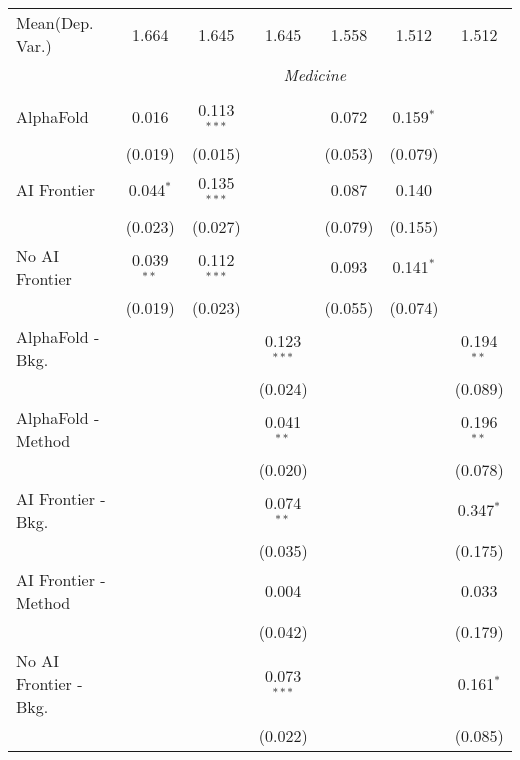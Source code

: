 \begin{tabular}{lcccccc}
Mean(Dep. Var.) & 1.664 & 1.645 & 1.645 & 1.558 & 1.512 & 1.512 \\
 & \multicolumn{6}{c}{\textit{Medicine}} \\ \\
   AlphaFold               & 0.016        & 0.113$^{***}$ &               & 0.072   & 0.159$^{*}$ &   \\   
                           & (0.019)      & (0.015)       &               & (0.053) & (0.079)     &   \\   
   AI Frontier             & 0.044$^{*}$  & 0.135$^{***}$ &               & 0.087   & 0.140       &   \\   
                           & (0.023)      & (0.027)       &               & (0.079) & (0.155)     &   \\   
   No AI Frontier          & 0.039$^{**}$ & 0.112$^{***}$ &               & 0.093   & 0.141$^{*}$ &   \\   
                           & (0.019)      & (0.023)       &               & (0.055) & (0.074)     &   \\   
   AlphaFold - Bkg.        &              &               & 0.123$^{***}$ &         &             & 0.194$^{**}$\\   
                           &              &               & (0.024)       &         &             & (0.089)\\   
   AlphaFold - Method      &              &               & 0.041$^{**}$  &         &             & 0.196$^{**}$\\   
                           &              &               & (0.020)       &         &             & (0.078)\\   
   AI Frontier - Bkg.      &              &               & 0.074$^{**}$  &         &             & 0.347$^{*}$\\   
                           &              &               & (0.035)       &         &             & (0.175)\\   
   AI Frontier - Method    &              &               & 0.004         &         &             & 0.033\\   
                           &              &               & (0.042)       &         &             & (0.179)\\   
   No AI Frontier - Bkg.   &              &               & 0.073$^{***}$ &         &             & 0.161$^{*}$\\   
                           &              &               & (0.022)       &         &             & (0.085)\\   

\end{tabular}
